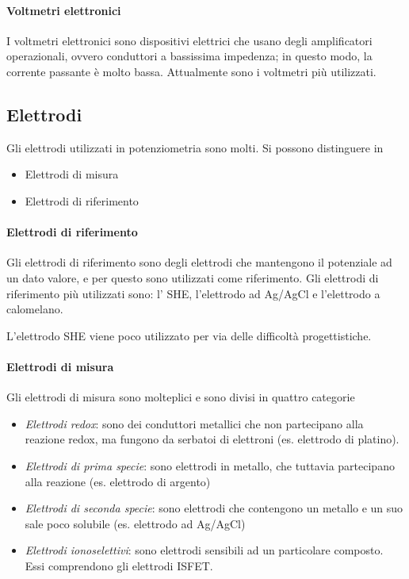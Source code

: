 \paragraph{Voltmetri elettronici}
I voltmetri elettronici sono dispositivi elettrici che usano degli amplificatori operazionali, ovvero conduttori a bassissima impedenza; in questo modo, la corrente passante è molto bassa.
Attualmente sono i voltmetri più utilizzati.


\subsection{Elettrodi}
Gli elettrodi utilizzati in potenziometria sono molti. Si possono distinguere in
\begin{itemize}
\item Elettrodi di misura
\item Elettrodi di riferimento
\end{itemize}

\paragraph{Elettrodi di riferimento}
Gli elettrodi di riferimento sono degli elettrodi che mantengono il potenziale ad un dato valore, e per questo sono utilizzati come riferimento.
Gli elettrodi di riferimento più utilizzati sono: l' SHE, l'elettrodo ad Ag/AgCl e l'elettrodo a calomelano.


L'elettrodo SHE viene poco utilizzato per via delle difficoltà progettistiche.

\paragraph{Elettrodi di misura}
Gli elettrodi di misura sono molteplici e sono divisi in quattro categorie
\begin{itemize}
\item \textit{Elettrodi redox}: sono dei conduttori metallici che non partecipano alla reazione redox, ma fungono da serbatoi di elettroni (es. elettrodo di platino).
\item \textit{Elettrodi di prima specie}: sono elettrodi in metallo, che tuttavia partecipano alla reazione (es. elettrodo di argento)
\item \textit{Elettrodi di seconda specie}: sono elettrodi che contengono un metallo e un suo sale poco solubile (es. elettrodo ad Ag/AgCl)
\item \textit{Elettrodi ionoselettivi}: sono elettrodi sensibili ad un particolare composto. Essi comprendono gli elettrodi ISFET.
\end{itemize}

